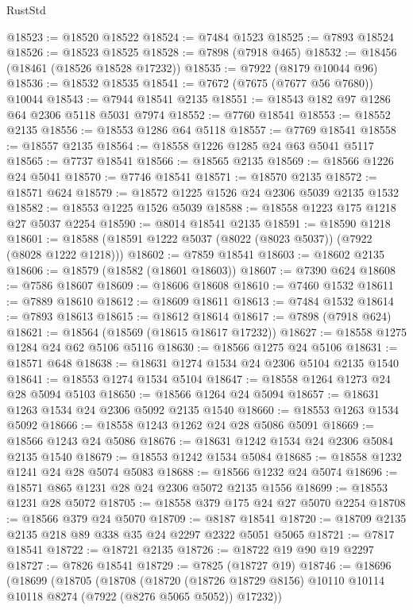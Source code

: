 \begin{lexlean}{RustStd}
\begin{coremodule}
@18523 := @18520 @18522
@18524 := @7484 @1523
@18525 := @7893 @18524
@18526 := @18523 @18525
@18528 := @7898 (@7918 @465)
@18532 := @18456 (@18461 (@18526 @18528 @17232))
@18535 := @7922 (@8179 @10044 @96)
@18536 := @18532 @18535
@18541 := @7672 (@7675 (@7677 @56 @7680)) @10044
@18543 := @7944 @18541 @2135
@18551 := @18543 @182 @97 @1286 @64 @2306 @5118 @5031 @7974
@18552 := @7760 @18541
@18553 := @18552 @2135
@18556 := @18553 @1286 @64 @5118
@18557 := @7769 @18541
@18558 := @18557 @2135
@18564 := @18558 @1226 @1285 @24 @63 @5041 @5117
@18565 := @7737 @18541
@18566 := @18565 @2135
@18569 := @18566 @1226 @24 @5041
@18570 := @7746 @18541
@18571 := @18570 @2135
@18572 := @18571 @624
@18579 := @18572 @1225 @1526 @24 @2306 @5039 @2135 @1532
@18582 := @18553 @1225 @1526 @5039
@18588 := @18558 @1223 @175 @1218 @27 @5037 @2254
@18590 := @8014 @18541 @2135
@18591 := @18590 @1218
@18601 := @18588 (@18591 @1222 @5037 (@8022 (@8023 @5037)) (@7922 (@8028 @1222 @1218)))
@18602 := @7859 @18541
@18603 := @18602 @2135
@18606 := @18579 (@18582 (@18601 @18603))
@18607 := @7390 @624
@18608 := @7586 @18607
@18609 := @18606 @18608
@18610 := @7460 @1532
@18611 := @7889 @18610
@18612 := @18609 @18611
@18613 := @7484 @1532
@18614 := @7893 @18613
@18615 := @18612 @18614
@18617 := @7898 (@7918 @624)
@18621 := @18564 (@18569 (@18615 @18617 @17232))
@18627 := @18558 @1275 @1284 @24 @62 @5106 @5116
@18630 := @18566 @1275 @24 @5106
@18631 := @18571 @648
@18638 := @18631 @1274 @1534 @24 @2306 @5104 @2135 @1540
@18641 := @18553 @1274 @1534 @5104
@18647 := @18558 @1264 @1273 @24 @28 @5094 @5103
@18650 := @18566 @1264 @24 @5094
@18657 := @18631 @1263 @1534 @24 @2306 @5092 @2135 @1540
@18660 := @18553 @1263 @1534 @5092
@18666 := @18558 @1243 @1262 @24 @28 @5086 @5091
@18669 := @18566 @1243 @24 @5086
@18676 := @18631 @1242 @1534 @24 @2306 @5084 @2135 @1540
@18679 := @18553 @1242 @1534 @5084
@18685 := @18558 @1232 @1241 @24 @28 @5074 @5083
@18688 := @18566 @1232 @24 @5074
@18696 := @18571 @865 @1231 @28 @24 @2306 @5072 @2135 @1556
@18699 := @18553 @1231 @28 @5072
@18705 := @18558 @379 @175 @24 @27 @5070 @2254
@18708 := @18566 @379 @24 @5070
@18709 := @8187 @18541
@18720 := @18709 @2135 @2135 @218 @89 @338 @35 @24 @2297 @2322 @5051 @5065
@18721 := @7817 @18541
@18722 := @18721 @2135
@18726 := @18722 @19 @90 @19 @2297
@18727 := @7826 @18541
@18729 := @7825 (@18727 @19)
@18746 := @18696
    (@18699
      (@18705
        (@18708
          (@18720
            (@18726 @18729 @8156)
            @10110
            @10114
            @10118
            @8274
            (@7922 (@8276 @5065 @5052))
            @17232))

\end{coremodule}
\end{lexlean}
